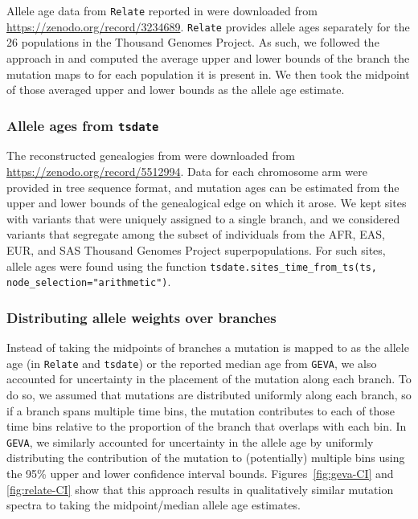 \documentclass[]{article}
\newcommand{\GEVA}{\texttt{GEVA}\xspace}
\newcommand{\tsdate}{\texttt{tsdate}\xspace}
\newcommand{\relate}{\texttt{Relate}\xspace}
\begin{document}
Allele age data from \relate reported in \citet{speidel2019method} were
downloaded from \url{https://zenodo.org/record/3234689}. \relate provides
allele ages separately for the 26 populations in the Thousand Genomes Project.
As such, we followed the approach in \citet{wohns2022unified} and computed the
average upper and lower bounds of the branch the mutation maps to for each
population it is present in. We then took the midpoint of those averaged
upper and lower bounds as the allele age estimate.

\subsubsection*{Allele ages from \tsdate}

The reconstructed genealogies from \citet{wohns2022unified} were downloaded
from \url{https://zenodo.org/record/5512994}. Data for each chromosome arm were
provided in tree sequence format, and mutation ages can be estimated from the
upper and lower bounds of the genealogical edge on which it arose. We kept
sites with variants that were uniquely assigned to a single branch, and we
considered variants that segregate among the subset of individuals from the
AFR, EAS, EUR, and SAS Thousand Genomes Project superpopulations. For such
sites, allele ages were found using the function
\texttt{tsdate.sites\_time\_from\_ts(ts, node\_selection="arithmetic")}.

\subsubsection*{Distributing allele weights over branches}

Instead of taking the midpoints of branches a mutation is mapped to as the
allele age (in \relate and \tsdate) or the reported median age from \GEVA, we
also accounted for uncertainty in the placement of the mutation along each
branch. To do so, we assumed that mutations are distributed uniformly along
each branch, so if a branch spans multiple time bins, the mutation contributes
to each of those time bins relative to the proportion of the branch that
overlaps with each bin. In \GEVA, we similarly accounted for uncertainty in the
allele age by uniformly distributing the contribution of the mutation to
(potentially) multiple bins using the 95\% upper and lower confidence interval
bounds. Figures~\ref{fig:geva-CI} and \ref{fig:relate-CI} show that this approach
results in qualitatively similar mutation spectra to taking the midpoint/median
allele age estimates.
\end{document}
